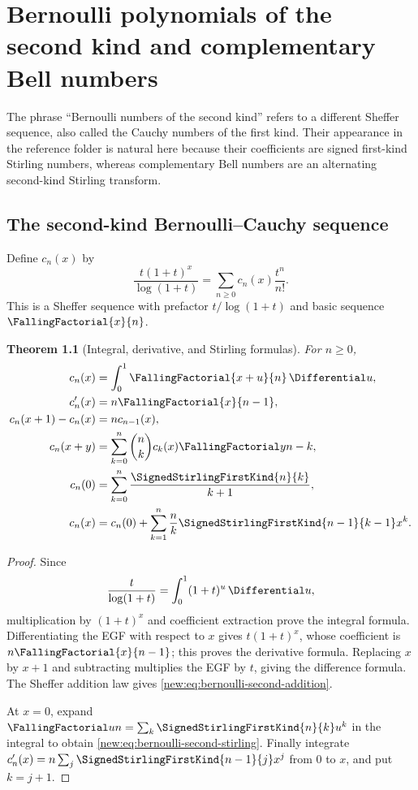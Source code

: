 \documentclass[11pt,a4paper,oneside,openany]{book}
\newtheorem{theorem}{Theorem}[chapter]
\theoremstyle{definition}
\theoremstyle{remark}
\begin{document}
\chapter{Bernoulli polynomials of the second kind and complementary Bell numbers}
\label{ch:second-bernoulli-complementary-bell}

The phrase ``Bernoulli numbers of the second kind'' refers to a different
Sheffer sequence, also called the Cauchy numbers of the first kind.  Their
appearance in the reference folder is natural here because their coefficients
are signed first-kind Stirling numbers, whereas complementary Bell numbers are
an alternating second-kind Stirling transform.

\section{The second-kind Bernoulli--Cauchy sequence}

Define $c_n(x)$ by
\begin{equation}
 \frac{t(1+t)^x}{\log(1+t)}
 =\sum_{n\ge0}c_n(x)\frac{t^n}{n!}.
 \label{new:eq:bernoulli-second-egf}
\end{equation}
This is a Sheffer sequence with prefactor $t/\log(1+t)$ and basic sequence
$\FallingFactorial{x}{n}$.

\begin{theorem}[Integral, derivative, and Stirling formulas]
For $n\ge0$,
\begin{align}
 c_n(x)&=\int_0^1\FallingFactorial{x+u}{n}\,\Differential u,
 \label{new:eq:bernoulli-second-integral}\\
 c_n'(x)&=n\FallingFactorial{x}{n-1},
 \label{new:eq:bernoulli-second-derivative}\\
 c_n(x+1)-c_n(x)&=nc_{n-1}(x),
 \label{new:eq:bernoulli-second-difference}\\
 c_n(x+y)&=\sum_{k=0}^n\binom nk c_k(x)\FallingFactorial y{n-k},
 \label{new:eq:bernoulli-second-addition}\\
 c_n(0)&=\sum_{k=0}^n\frac{\SignedStirlingFirstKind{n}{k}}{k+1},
 \label{new:eq:bernoulli-second-stirling}\\
 c_n(x)&=c_n(0)+\sum_{k=1}^n\frac nk \SignedStirlingFirstKind{n-1}{k-1}x^k.
 \label{new:eq:bernoulli-second-explicit}
\end{align}
\end{theorem}

\begin{proof}
Since
\[
 \frac{t}{\log(1+t)}=\int_0^1(1+t)^u\,\Differential u,
\]
multiplication by $(1+t)^x$ and coefficient extraction prove the integral
formula.  Differentiating the EGF with respect to $x$ gives
$t(1+t)^x$, whose coefficient is
$n\FallingFactorial{x}{n-1}$; this proves the derivative formula.  Replacing $x$ by
$x+1$ and subtracting multiplies the EGF by $t$, giving the difference formula.
The Sheffer addition law gives \eqref{new:eq:bernoulli-second-addition}.

At $x=0$, expand $\FallingFactorial u n=\sum_k \SignedStirlingFirstKind{n}{k}u^k$ in the integral to obtain
\eqref{new:eq:bernoulli-second-stirling}.  Finally integrate
$c_n'(x)=n\sum_j \SignedStirlingFirstKind{n-1}{j}x^j$ from $0$ to $x$, and put $k=j+1$.
\end{proof}
\end{document}
